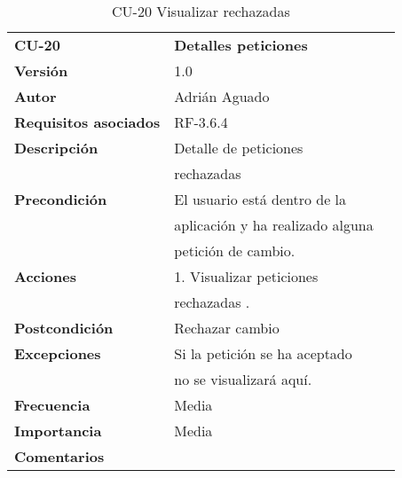 \begin{table}[H]
\begin{tabular}{llr}  
\toprule
\begin{minipage}[b]{0.24\columnwidth}\raggedright\strut
\textbf{CU-20}\strut
\end{minipage} & \begin{minipage}[b]{0.72\columnwidth}\raggedright\strut
\textbf{Detalles peticiones}\strut
\end{minipage}\tabularnewline
\cmidrule(r){1-2}
\textbf{Versión}       & 1.0           \\
\textbf{Autor}       & Adrián  Aguado    \\
\textbf{Requisitos asociados}       & RF-3.6.4  \\
\textbf{Descripción} & Detalle de peticiones \\
& rechazadas \\
\textbf{Precondición}  & El usuario está dentro de la \\
& aplicación y ha realizado alguna  \\
& petición de cambio.  \\
\textbf{Acciones} & 1. Visualizar peticiones\\
& rechazadas . \\
\textbf{Postcondición} &  Rechazar cambio \\
\textbf{Excepciones} &  Si la petición se ha aceptado   \\
&  no se visualizará aquí.   \\
\textbf{Frecuencia} & Media          \\
\textbf{Importancia} & Media           \\
\textbf{Comentarios } &   \\
\bottomrule
\end{tabular}
\caption{CU-20 Visualizar rechazadas} 
\end{table}

